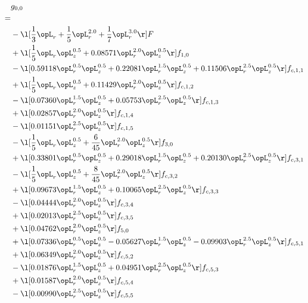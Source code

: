 \begin{alignat}{2} 
\label{eq:g_00_0} 
& g_{0,0} \nonumber \\ 
 = \\ 
& - \l[ \frac{1}{3} \opL_r + \frac{1}{5} \opL_r^{2.0} + \frac{1}{7} \opL_r^{3.0}  \r] F \nonumber \\ 
& + \l[ \frac{1}{5} \opL_r \opL_z^{0.5} +  0.08571 \opL_r^{2.0} \opL_z^{0.5}  \r] f_{1,0} \nonumber \\ 
& - \l[  0.59118 \opL_r^{0.5} \opL_z^{0.5} +  0.22081 \opL_r^{1.5} \opL_z^{0.5} +  0.11506 \opL_r^{2.5} \opL_z^{0.5}  \r] f_{c,1,1} \nonumber \\ 
& + \l[ \frac{1}{5} \opL_r \opL_z^{0.5} +  0.11429 \opL_r^{2.0} \opL_z^{0.5}  \r] f_{c,1,2} \nonumber \\ 
& - \l[  0.07360 \opL_r^{1.5} \opL_z^{0.5} +  0.05753 \opL_r^{2.5} \opL_z^{0.5}  \r] f_{c,1,3} \nonumber \\ 
& + \l[  0.02857 \opL_r^{2.0} \opL_z^{0.5}  \r] f_{c,1,4} \nonumber \\ 
& - \l[  0.01151 \opL_r^{2.5} \opL_z^{0.5}  \r] f_{c,1,5} \nonumber \\ 
& - \l[ \frac{1}{5} \opL_r \opL_z^{0.5} + \frac{6}{45} \opL_r^{2.0} \opL_z^{0.5}  \r] f_{3,0} \nonumber \\ 
& + \l[  0.33801 \opL_r^{0.5} \opL_z^{0.5} +  0.29018 \opL_r^{1.5} \opL_z^{0.5} +  0.20130 \opL_r^{2.5} \opL_z^{0.5}  \r] f_{c,3,1} \nonumber \\ 
& - \l[ \frac{1}{5} \opL_r \opL_z^{0.5} + \frac{8}{45} \opL_r^{2.0} \opL_z^{0.5}  \r] f_{c,3,2} \nonumber \\ 
& + \l[  0.09673 \opL_r^{1.5} \opL_z^{0.5} +  0.10065 \opL_r^{2.5} \opL_z^{0.5}  \r] f_{c,3,3} \nonumber \\ 
& - \l[  0.04444 \opL_r^{2.0} \opL_z^{0.5}  \r] f_{c,3,4} \nonumber \\ 
& + \l[  0.02013 \opL_r^{2.5} \opL_z^{0.5}  \r] f_{c,3,5} \nonumber \\ 
& + \l[  0.04762 \opL_r^{2.0} \opL_z^{0.5}  \r] f_{5,0} \nonumber \\ 
& + \l[  0.07336 \opL_r^{0.5} \opL_z^{0.5}   -0.05627 \opL_r^{1.5} \opL_z^{0.5}   -0.09903 \opL_r^{2.5} \opL_z^{0.5}  \r] f_{c,5,1} \nonumber \\ 
& + \l[  0.06349 \opL_r^{2.0} \opL_z^{0.5}  \r] f_{c,5,2} \nonumber \\ 
& - \l[  0.01876 \opL_r^{1.5} \opL_z^{0.5} +  0.04951 \opL_r^{2.5} \opL_z^{0.5}  \r] f_{c,5,3} \nonumber \\ 
& + \l[  0.01587 \opL_r^{2.0} \opL_z^{0.5}  \r] f_{c,5,4} \nonumber \\ 
& - \l[  0.00990 \opL_r^{2.5} \opL_z^{0.5}  \r] f_{c,5,5} \nonumber \\ 
\end{alignat} 


